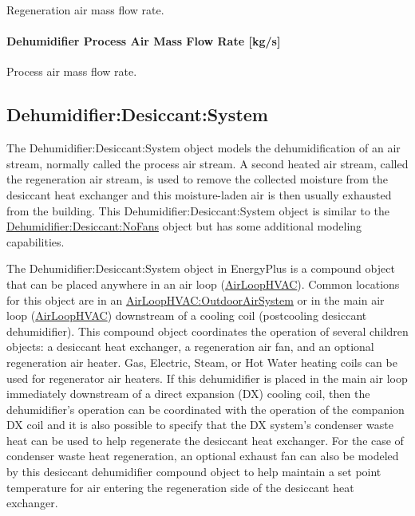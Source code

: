 Regeneration air mass flow rate.

\paragraph{Dehumidifier Process Air Mass Flow Rate {[}kg/s{]}}\label{dehumidifier-process-air-mass-flow-rate-kgs}

Process air mass flow rate.

\subsection{Dehumidifier:Desiccant:System}\label{dehumidifierdesiccantsystem}

The Dehumidifier:Desiccant:System object models the dehumidification of an air stream, normally called the process air stream. A second heated air stream, called the regeneration air stream, is used to remove the collected moisture from the desiccant heat exchanger and this moisture-laden air is then usually exhausted from the building. This Dehumidifier:Desiccant:System object is similar to the \hyperref[dehumidifierdesiccantnofans]{Dehumidifier:Desiccant:NoFans} object but has some additional modeling capabilities.

The Dehumidifier:Desiccant:System object in EnergyPlus is a compound object that can be placed anywhere in an air loop (\hyperref[airloophvac]{AirLoopHVAC}). Common locations for this object are in an \hyperref[airloophvacoutdoorairsystem]{AirLoopHVAC:OutdoorAirSystem} or in the main air loop (\hyperref[airloophvac]{AirLoopHVAC}) downstream of a cooling coil (postcooling desiccant dehumidifier). This compound object coordinates the operation of several children objects: a desiccant heat exchanger, a regeneration air fan, and an optional regeneration air heater. Gas, Electric, Steam, or Hot Water heating coils can be used for regenerator air heaters. If this dehumidifier is placed in the main air loop immediately downstream of a direct expansion (DX) cooling coil, then the dehumidifier's operation can be coordinated with the operation of the companion DX coil and it is also possible to specify that the DX system's condenser waste heat can be used to help regenerate the desiccant heat exchanger. For the case of condenser waste heat regeneration, an optional exhaust fan can also be modeled by this desiccant dehumidifier compound object to help maintain a set point temperature for air entering the regeneration side of the desiccant heat exchanger.

